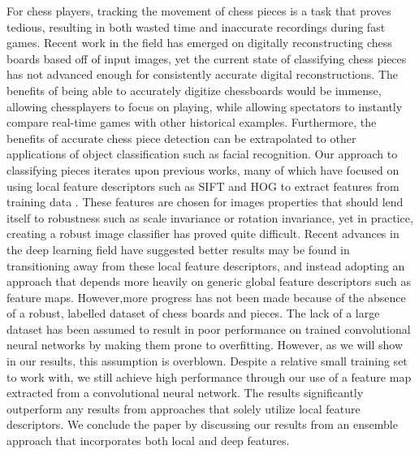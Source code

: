 \documentclass{article}
\begin{document}
\hspace{\parindent}For chess players, tracking the movement of chess pieces is a task that proves tedious, resulting in both wasted time and inaccurate recordings during fast games. Recent work in the field has emerged on digitally reconstructing chess boards based off of input images, yet the current state of classifying chess pieces has not advanced enough for consistently accurate digital reconstructions. The benefits of being able to accurately digitize chessboards would be immense, allowing chessplayers to focus on playing,\cite{densenet} while allowing spectators to instantly compare real-time games with other historical examples. Furthermore, the benefits of accurate chess piece detection can be extrapolated to other applications of object classification such as facial recognition. \newline
\indent Our approach to classifying pieces iterates upon previous works, many of which have focused on using local feature descriptors such as SIFT and HOG to extract features from training data  . These features are chosen for images properties that should lend itself to robustness such as  scale invariance or rotation invariance, yet in practice, creating a robust image classifier has proved quite difficult. Recent advances in the deep learning field have suggested better results may be found in transitioning away from these local feature descriptors, and instead adopting an approach that depends more heavily on generic global feature descriptors such as feature maps. However,more progress has not been made because of the absence of a robust, labelled dataset of chess boards and pieces. The lack of a large dataset has been assumed to result in poor performance on trained convolutional neural networks by making them prone to overfitting. However, as we will show in our results, this assumption is overblown. Despite a relative small training set to work with, we still achieve  high performance through our use of a feature map extracted from a convolutional neural network. The results significantly outperform any results from approaches that solely utilize local feature descriptors. We conclude the paper by discussing our results from an ensemble approach that incorporates both local and deep features. 
\end{document}

